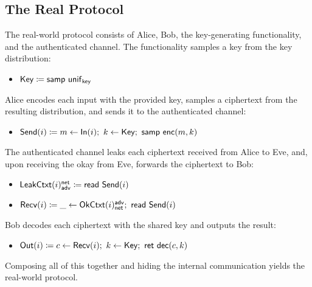 \subsection{The Real Protocol}
The real-world protocol consists of Alice, Bob, the key-generating functionality, and the authenticated channel. The functionality samples a key from the key distribution:
\begin{itemize}
\item $\mathsf{Key} \coloneqq \mathsf{samp} \ \mathsf{unif}_{\mathsf{key}}$
\end{itemize}
Alice encodes each input with the provided key, samples a ciphertext from the resulting distribution, and sends it to the authenticated channel: 
\begin{itemize}
\item $\mathsf{Send}(i) \coloneqq m \leftarrow \mathsf{In}(i); \ k \leftarrow \mathsf{Key}; \ \mathsf{samp} \ \mathsf{enc}(m,k)$
\end{itemize}
The authenticated channel leaks each ciphertext received from Alice to Eve, and, upon receiving the okay from Eve, forwards the ciphertext to Bob:
\begin{itemize}
\item $\mathsf{LeakCtxt}(i)^{\mathsf{net}}_{\mathsf{adv}} \coloneqq \mathsf{read} \ \mathsf{Send}(i)$
\item $\mathsf{Recv}(i) \coloneqq \_ \leftarrow \mathsf{OkCtxt}(i)^{\mathsf{adv}}_{\mathsf{net}}; \ \mathsf{read} \ \mathsf{Send}(i)$
\end{itemize}
Bob decodes each ciphertext with the shared key and outputs the result:
\begin{itemize}
\item $\mathsf{Out}(i) \coloneqq c \leftarrow \mathsf{Recv}(i); \ k \leftarrow \mathsf{Key}; \ \mathsf{ret} \ \mathsf{dec}(c,k)$
\end{itemize}
Composing all of this together and hiding the internal communication yields the real-world protocol.

